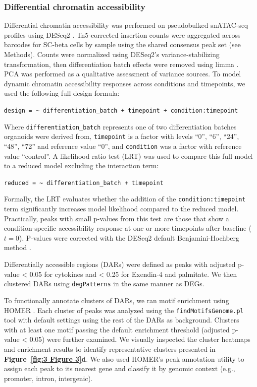 \subsubsection{Differential chromatin accessibility}

Differential chromatin accessibility was performed on pseudobulked snATAC-seq profiles using DESeq2 \cite{Love2014-rn}. Tn5-corrected insertion counts were aggregated across barcodes for SC-beta cells by sample using the shared consensus peak set (see Methods). Counts were normalized using DESeq2’s variance-stabilizing transformation, then differentiation batch effects were removed using limma \cite{Ritchie2015-ec}. PCA was performed as a qualitative assessment of variance sources. To model dynamic chromatin accessibility responses across conditions and timepoints, we used the following full design formula:

\texttt{design = \textasciitilde{} differentiation\_batch + timepoint + condition:timepoint}

Where \texttt{differentiation\_batch} represents one of two differentiation batches organoids were derived from, \texttt{timepoint} is a factor with levels ``0'', ``6'', ``24'', ``48'', ``72'' and reference value ``0'', and \texttt{condition} was a factor with reference value ``control''. A likelihood ratio test (LRT) was used to compare this full model to a reduced model excluding the interaction term:

\texttt{reduced = \textasciitilde{} differentiation\_batch + timepoint}

Formally, the LRT evaluates whether the addition of the \texttt{condition:timepoint} term significantly increases model likelihood compared to the reduced model. Practically, peaks with small p-values from this test are those that show a condition-specific accessibility response at one or more timepoints after baseline (\(t = 0\)). P-values were corrected with the DESeq2 default Benjamini-Hochberg method \cite{Benjamini1995-da}.

Differentially accessible regions (DARs) were defined as peaks with adjusted p-value < 0.05 for cytokines and < 0.25 for Exendin-4 and palmitate. We then clustered DARs using \texttt{degPatterns} in the same manner as DEGs.

To functionally annotate clusters of DARs, we ran motif enrichment using HOMER \cite{Heinz2010-yo}. Each cluster of peaks was analyzed using the \texttt{findMotifsGenome.pl} tool with default settings using the rest of the DARs as background. Clusters with at least one motif passing the default enrichment threshold (adjusted p-value < 0.05) were further examined. We visually inspected the cluster heatmaps and enrichment results to identify representative clusters presented in \textbf{Figure~\ref{fig:3 Figure 3}d}. We also used HOMER’s peak annotation utility to assign each peak to its nearest gene and classify it by genomic context (e.g., promoter, intron, intergenic).

